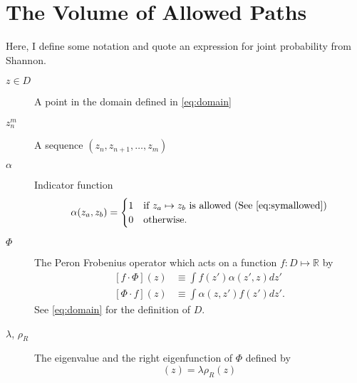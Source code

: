 \documentclass[twocolumn]{article}
\newcommand{\field}[1]{\mathbb{#1}}
\newcommand\REAL{\field{R}}
\begin{document}
\section{The Volume of Allowed Paths}
\label{sec:volume}

Here, I define some notation and quote an expression for joint
probability from Shannon.%
\newcommand{\tuple}[2]{z_{#1}^{#2}}%
\newcommand{\allowed}{\alpha}%
\newcommand{\preimage}{\tau}%
\newcommand{\scale}[1]{\psi_{#1}}%
\newcommand{\stationary}{\mu}%
\newcommand{\pair}{\beta}%
\newcommand{\ptuple}[1]{\gamma_{#1}}%
\newcommand{\Skip}[1]{\delta_{#1}}%
\newcommand{\PFop}{\Phi} %
\newcommand{\pfop}{\phi} %
\newcommand{\lefunc}{\rho_L}%
\newcommand{\refunc}{\rho_R}%
\newcommand{\eval}{\lambda}
\newcommand{\suparg}[1]{^{[#1]}}
\newcommand{\supn}{\suparg{n}}
\begin{description}
\item[$z\in D$] A point in the domain defined in \eqref{eq:domain}
\item[$\tuple{n}{m}$] A sequence $(z_n, z_{n+1}, \ldots, z_m)$
\item[$\allowed$] Indicator function
  \begin{equation*}
    \allowed(z_a,z_b) =
    \begin{cases}
      1 & \text{if }z_a \mapsto z_b
      \text{ is allowed (See \eqref{eq:symallowed})}\\
      0 & \text{otherwise}.
    \end{cases}
  \end{equation*}
\item[$\PFop$] The Peron Frobenius operator which acts on a
  function $f:D\mapsto \REAL$ by 
  \begin{subequations}
    \label{eq:PFop}
    \begin{align}
      \left[f \cdot \PFop \right] (z) &\equiv \int f(z') \allowed(z',z)
      dz' \\
      \left[ \PFop \cdot f \right] (z) &\equiv \int \allowed(z,z')
      f(z') dz'.
    \end{align}
  \end{subequations}
  See \eqref{eq:domain} for the definition of $D$. 
\item[$\eval$, $\refunc$] The eigenvalue and the right eigenfunction
  of $\PFop$ defined by
  \begin{equation*}
    [\PFop \cdot \refunc] (z) = \eval \refunc(z)
  \end{equation*}

\end{description}
\end{document}
